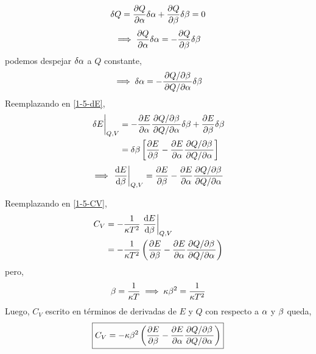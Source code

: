\begin{sol}
\begin{enumerate}
\begin{equation}
  \delta Q=\pdv{Q}{\alpha}\delta \alpha +\pdv{Q}{\beta}\delta \beta =0
\end{equation}
\begin{equation}
  \implies \pdv{Q}{\alpha}\delta \alpha=-\pdv{Q}{\beta}\delta\beta 
\end{equation}
podemos despejar $\delta\alpha$ a $Q$ constante,
\begin{equation}
  \implies \delta\alpha =-\frac{\pdv*{Q}{\beta }}{\pdv*{Q}{\alpha }}\delta\beta 
\end{equation}
Reemplazando en \eqref{1-5-dE},
\begin{align}
 \eval{\d E}_{Q,V}&=-\pdv{E}{\a }\frac{\pdv*{Q}{\b }}{\pdv*{Q}{\alpha }}\d\b +\pdv{E}{\b }\d \b \\
 &=\d\b\left[\pdv{E}{\b }-\pdv{E}{\a }\frac{\pdv*{Q}{\b }}{\pdv*{Q}{\alpha }}\right]
\end{align}
\begin{equation}
  \implies \eval{\dv{E}{\b }}_{Q,V}=\pdv{E}{\b }-\pdv{E}{\a }\frac{\pdv*{Q}{\b }}{\pdv*{Q}{\alpha }}
\end{equation}

Reemplazando en \eqref{1-5-CV},
\begin{align}
   C_V&=-\frac{1}{\k T^2}\eval{\dv{E}{\b }}_{Q,V}\\
   &=-\frac{1}{\k T^2}\left(\pdv{E}{\b }-\pdv{E}{\a }\frac{\pdv*{Q}{\b }}{\pdv*{Q}{\alpha }}\right)
\end{align}
pero,
\begin{equation}
  \beta=\frac{1}{\kappa T}\implies \kappa \beta^2=\frac{1}{\kappa T^2}
\end{equation}
Luego, $C_V$ escrito en términos de derivadas de $E$ y $Q$ con respecto a $\alpha$ y $\beta$ queda,
\begin{equation}
 \boxed{ C_V=-\kappa\beta^2\left(\pdv{E}{\beta}-\pdv{E}{\alpha}\frac{\pdv*{Q}{\beta }}{\pdv*{Q}{\alpha }}\right)}
\end{equation}



\end{enumerate}
\end{sol}
